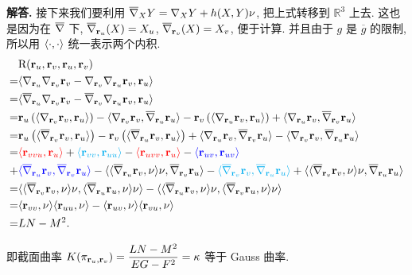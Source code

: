 \documentclass{ctexart}
\newenvironment{solution}{\par\noindent\textbf{解答. }}{\par}
\newcommand{\cred}{\textcolor{red}}
\newcommand{\cblue}{\textcolor{blue}}
\newcommand{\ccyan}{\textcolor{cyan}}
\begin{document}
\begin{solution}
    接下来我们要利用 $\overline{\nabla}_{X}Y = \nabla_{X}Y + h(X, Y)\nu$, 把上式转移到 $\mathbb{R}^3$ 上去. 这也是因为在 $\overline{\nabla}$ 下, $\overline{\nabla}_{\mathbf{r}_u}(X) = X_u$, $\overline{\nabla}_{\mathbf{r}_v}(X) = X_v$, 便于计算. 并且由于 $g$ 是 $\overline{g}$ 的限制, 所以用 $\langle {\cdot}, {\cdot} \rangle$ 统一表示两个内积.
    \[
        \begin{aligned}
             & \R(\rvec_u, \rvec_v, \rvec_u, \rvec_v) \\
            =& \Inner{\Div{\rvec_u}\Div{\rvec_v}\rvec_v - \Div{\rvec_v}\Div{\rvec_u}\rvec_v}{\rvec_u} \\
            =& \Inner{\bDiv{\rvec_u}\Div{\rvec_v}\rvec_v - \bDiv{\rvec_v}\Div{\rvec_u}\rvec_v}{\rvec_u} \\
            =& \rvec_u\left( \Inner{\Div{\rvec_v}\rvec_v}{\rvec_u} \right) - \Inner{\Div{\rvec_v}\rvec_v}{\bDiv{\rvec_u}\rvec_u} - \rvec_v\left( \Inner{\Div{\rvec_u}\rvec_v}{\rvec_u} \right) + \Inner{\Div{\rvec_u}\rvec_v}{\bDiv{\rvec_v}\rvec_u} \\
            =& \rvec_u\left( \Inner{\bDiv{\rvec_v}\rvec_v}{\rvec_u} \right) - \rvec_v\left( \Inner{\bDiv{\rvec_u}\rvec_v}{\rvec_u} \right) + \Inner{\Div{\rvec_u}\rvec_v}{\bDiv{\rvec_v}\rvec_u} - \Inner{\Div{\rvec_v}\rvec_v}{\bDiv{\rvec_u}\rvec_u} \\
            =& \cred{\Inner{\rvec_{vvu}}{\rvec_u}} + \ccyan{\Inner{\rvec_{vv}}{\rvec_{uu}}} - \cred{\Inner{\rvec_{uvv}}{\rvec_u}} - \cblue{\Inner{\rvec_{uv}}{\rvec_{uv}}} \\
            +& \cblue{\Inner{\bDiv{\rvec_u}\rvec_v}{\bDiv{\rvec_v}\rvec_u}} - \Inner{\Inner{\bDiv{\rvec_u}\rvec_v}{\nu}\nu}{\bDiv{\rvec_v}\rvec_u} - \ccyan{\Inner{\bDiv{\rvec_v}\rvec_v}{\bDiv{\rvec_u}\rvec_u}} + \Inner{\Inner{\bDiv{\rvec_v}\rvec_v}{\nu}\nu}{\bDiv{\rvec_u}\rvec_u} \\
            =& \Inner{\Inner{\bDiv{\rvec_v}\rvec_v}{\nu}\nu}{\Inner{\bDiv{\rvec_u}\rvec_u}{\nu}\nu} - \Inner{\Inner{\bDiv{\rvec_u}\rvec_v}{\nu}\nu}{\Inner{\bDiv{\rvec_v}\rvec_u}{\nu}\nu} \\
            =& \Inner{\rvec_{vv}}{\nu}\Inner{\rvec_{uu}}{\nu} - \Inner{\rvec_{uv}}{\nu}\Inner{\rvec_{vu}}{\nu} \\
            =& LN - M^2.
        \end{aligned}
    \]

    即截面曲率 $K(\pi_{\mathbf{r}_u, \mathbf{r}_v}) = \dfrac{LN - M^2}{EG - F^2} = \kappa$ 等于 Gauss 曲率.
\end{solution}
\end{document}
